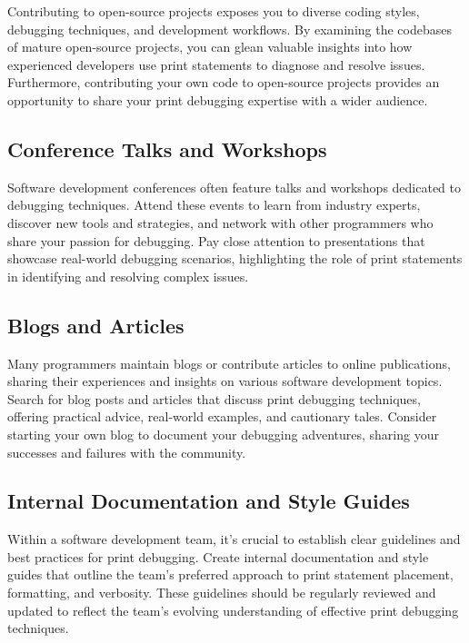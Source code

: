 \documentclass{article}
\begin{document}
{{{{Contributing to open-source projects exposes you to diverse coding styles, debugging techniques, and development workflows. By examining the codebases of mature open-source projects, you can glean valuable insights into how experienced developers use print statements to diagnose and resolve issues. Furthermore, contributing your own code to open-source projects provides an opportunity to share your print debugging expertise with a wider audience.

\subsection*{Conference Talks and Workshops}

Software development conferences often feature talks and workshops dedicated to debugging techniques. Attend these events to learn from industry experts, discover new tools and strategies, and network with other programmers who share your passion for debugging. Pay close attention to presentations that showcase real-world debugging scenarios, highlighting the role of print statements in identifying and resolving complex issues.

\subsection*{Blogs and Articles}

Many programmers maintain blogs or contribute articles to online publications, sharing their experiences and insights on various software development topics. Search for blog posts and articles that discuss print debugging techniques, offering practical advice, real-world examples, and cautionary tales. Consider starting your own blog to document your debugging adventures, sharing your successes and failures with the community.

\subsection*{Internal Documentation and Style Guides}

Within a software development team, it's crucial to establish clear guidelines and best practices for print debugging. Create internal documentation and style guides that outline the team's preferred approach to print statement placement, formatting, and verbosity. These guidelines should be regularly reviewed and updated to reflect the team's evolving understanding of effective print debugging techniques.

}}}}
\end{document}
